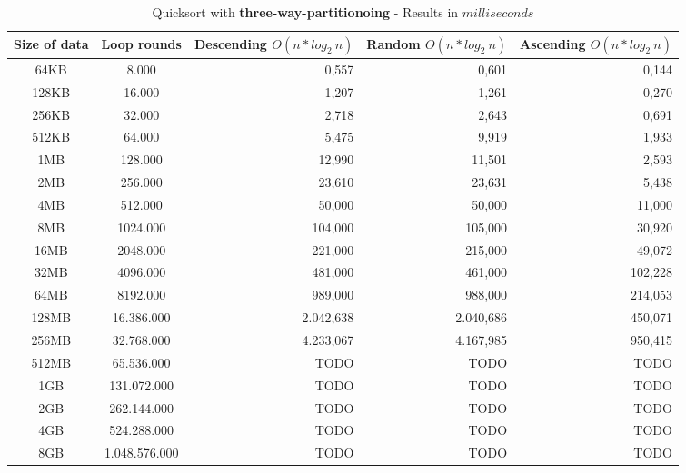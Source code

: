 \documentclass[11pt]{amsart}
\begin{document}
\begin{table}[htdp]
	\caption{Quicksort with \textbf{three-way-partitionoing} - Results in $milliseconds$}
	\begin{tabular}{|c|c|r|r|r|} \hline
		Size of data & Loop rounds & \parbox[c]{3.5cm}{Descending \\ $O(n*log_2~n)$} & \parbox[c]{3.5cm}{Random \\$O(n*log_2~n)$} & \parbox[c]{3.5cm}{Ascending \\ $O(n*log_2~n)$} \\ \hline
		64KB & 8.000 & 0,557 & 0,601 & 0,144 \\ \hline
		128KB & 16.000 & 1,207 & 1,261 & 0,270 \\ \hline
		256KB & 32.000& 2,718 & 2,643 & 0,691 \\ \hline
		512KB & 64.000 & 5,475 & 9,919 & 1,933 \\ \hline
		1MB & 128.000 & 12,990 & 11,501 & 2,593 \\ \hline
		2MB & 256.000 & 23,610 & 23,631 & 5,438 \\ \hline
		4MB & 512.000 & 50,000 & 50,000 & 11,000 \\ \hline
		8MB & 1024.000 & 104,000 & 105,000 & 30,920 \\ \hline
		16MB & 2048.000 & 221,000 & 215,000 & 49,072 \\ \hline
		32MB & 4096.000 & 481,000 & 461,000 & 102,228 \\ \hline
		64MB & 8192.000 & 989,000 & 988,000 & 214,053 \\ \hline
		128MB & 16.386.000 & 2.042,638 & 2.040,686 & 450,071 \\ \hline
		256MB & 32.768.000 & 4.233,067 & 4.167,985 & 950,415 \\ \hline
		512MB & 65.536.000 & TODO & TODO & TODO \\ \hline
		1GB & 131.072.000 & TODO & TODO & TODO \\ \hline
		2GB & 262.144.000 & TODO & TODO & TODO \\ \hline
		4GB & 524.288.000 & TODO & TODO & TODO \\ \hline
		8GB & 1.048.576.000 & TODO & TODO & TODO \\ \hline
	\end{tabular}
	\label{default}
\end{table}%
\end{document}
